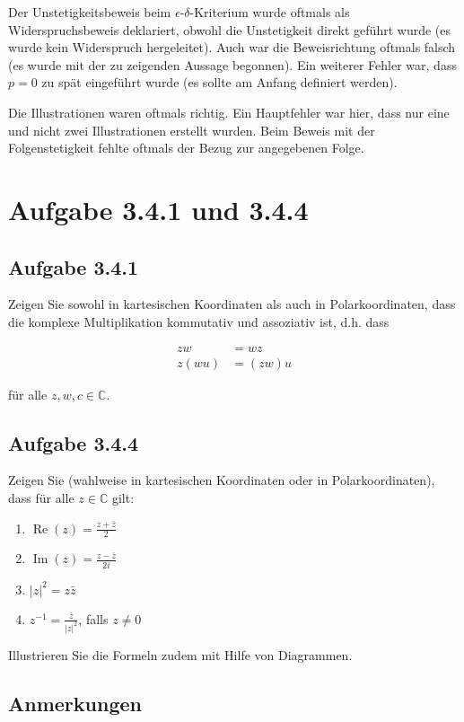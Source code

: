 \documentclass[a4paper]{article}
\newcommand*{\C}{\mathbb C}
\begin{document}
Der Unstetigkeitsbeweis beim $\epsilon$-$\delta$-Kriterium wurde oftmals als Widerspruchsbeweis deklariert, obwohl die Unstetigkeit direkt geführt wurde (es wurde kein Widerspruch hergeleitet). Auch war die Beweisrichtung oftmals falsch (es wurde mit der zu zeigenden Aussage begonnen). Ein weiterer Fehler war, dass $p=0$ zu spät eingeführt wurde (es sollte am Anfang definiert werden).

Die Illustrationen waren oftmals richtig. Ein Hauptfehler war hier, dass nur eine und nicht zwei Illustrationen erstellt wurden. Beim Beweis mit der Folgenstetigkeit fehlte oftmals der Bezug zur angegebenen Folge.

\section{Aufgabe 3.4.1 und 3.4.4}

\subsection{Aufgabe 3.4.1}

Zeigen Sie sowohl in kartesischen Koordinaten als auch in Polarkoordinaten, dass die komplexe Multiplikation kommutativ und assoziativ ist, d.h. dass

\begin{align}
  zw &= wz \\
  z(wu) &= (zw)u
\end{align}

für alle $z,w,c\in\C$.

\subsection{Aufgabe 3.4.4}

Zeigen Sie (wahlweise in kartesischen Koordinaten oder in Polarkoordinaten), dass für alle $z\in\C$ gilt:

\begin{enumerate}
  \item $\operatorname{Re}(z) = \frac{z+\bar z}2$
  \item $\operatorname{Im}(z) = \frac{z-\bar z}{2i}$
  \item $|z|^2=z\bar z$
  \item $z^{-1} = \frac{\bar z}{|z|^2}$, falls $z\neq 0$
\end{enumerate}

Illustrieren Sie die Formeln zudem mit Hilfe von Diagrammen.

\subsection{Anmerkungen}
\end{document}
